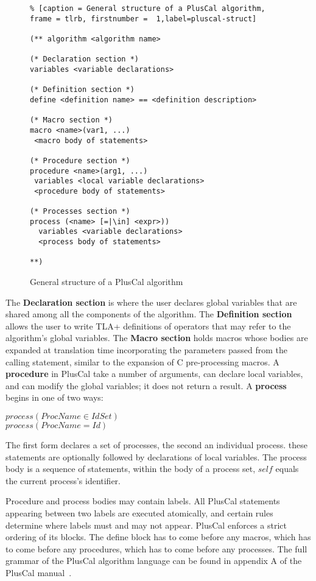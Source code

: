 \documentclass{thesul}
\begin{document}
\begin{figure}[!h]
\begin{lstlisting}% [caption = General structure of a PlusCal algorithm, frame = tlrb, firstnumber =  1,label=pluscal-struct]

(** algorithm <algorithm name>

(* Declaration section *)
variables <variable declarations>

(* Definition section *)
define <definition name> == <definition description>

(* Macro section *)
macro <name>(var1, ...)
 <macro body of statements>

(* Procedure section *)
procedure <name>(arg1, ...)
 variables <local variable declarations>
 <procedure body of statements>

(* Processes section *)
process (<name> [=|\in] <expr>))
  variables <variable declarations>
  <process body of statements>

**)

\end{lstlisting}
\caption{General structure of a PlusCal algorithm}
\label{pluscal-struct}
\end{figure}

The \textbf{Declaration section} is where the user declares global variables that are shared among all the components of the algorithm. The \textbf{Definition section} allows the user to write TLA+ definitions of operators that may refer to the algorithm's global variables.
The \textbf{Macro section} holds macros whose bodies are expanded at translation time incorporating the parameters passed from the calling statement, similar to the expansion of C pre-processing macros. A \textbf{procedure} in PlusCal take a number of arguments, can declare local variables, and can modify the global variables; it does not return a result. A \textbf{process} begins in one of two ways: 
\begin{center}
$process (ProcName \in IdSet)$ \\
$process (ProcName = Id)$
\end{center}

The first form declares a set of processes, the second an individual process. these statements are optionally followed by declarations of local variables. The process body is a sequence of statements, within the body of a process set, $self$ equals the current process's identifier.

Procedure and process bodies may contain labels. All PlusCal statements appearing between two labels are executed atomically, and certain rules determine where labels must and may not appear.
PlusCal enforces a strict ordering of its blocks. The define block has to come before any macros, which has to come before any procedures, which has to come before any processes. The full grammar of the PlusCal algorithm language can be found in appendix A of the PlusCal manual~\cite{pcalAlgo}.
\end{document}

